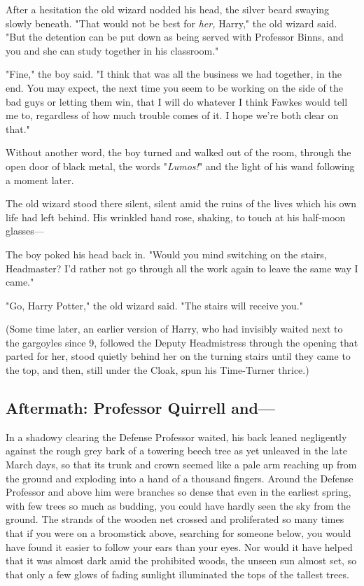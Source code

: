 After a hesitation the old wizard nodded his head, the silver beard swaying
slowly beneath. "That would not be best for \emph{her,} Harry," the old wizard
said. "But the detention can be put down as being served with Professor Binns,
and you and she can study together in his classroom."

"Fine," the boy said. "I think that was all the business we had together, in
the end. You may expect, the next time you seem to be working on the side of
the bad guys or letting them win, that I will do whatever I think Fawkes would
tell me to, regardless of how much trouble comes of it. I hope we're both clear
on that."

Without another word, the boy turned and walked out of the room, through the
open door of black metal, the words "\emph{Lumos!}" and the light of his wand
following a moment later.

The old wizard stood there silent, silent amid the ruins of the lives which his
own life had left behind. His wrinkled hand rose, shaking, to touch at his
half-moon glasses---

The boy poked his head back in. "Would you mind switching on the stairs,
Headmaster? I'd rather not go through all the work again to leave the same way
I came."

"Go, Harry Potter," the old wizard said. "The stairs will receive you."

(Some time later, an earlier version of Harry, who had invisibly waited next to
the gargoyles since 9\PM, followed the Deputy Headmistress through the opening
that parted for her, stood quietly behind her on the turning stairs until they
came to the top, and then, still under the Cloak, spun his Time-Turner thrice.)
\sbreak
\vspace{-2\baselineskip}
\subsection{Aftermath: Professor Quirrell and---}

In a shadowy clearing the Defense Professor waited, his back leaned negligently
against the rough grey bark of a towering beech tree as yet unleaved in the
late March days, so that its trunk and crown seemed like a pale arm reaching up
from the ground and exploding into a hand of a thousand fingers. Around the
Defense Professor and above him were branches so dense that even in the
earliest spring, with few trees so much as budding, you could have hardly seen
the sky from the ground. The strands of the wooden net crossed and proliferated
so many times that if you were on a broomstick above, searching for someone
below, you would have found it easier to follow your ears than your eyes. Nor
would it have helped that it was almost dark amid the prohibited woods, the
unseen sun almost set, so that only a few glows of fading sunlight illuminated
the tops of the tallest trees.

